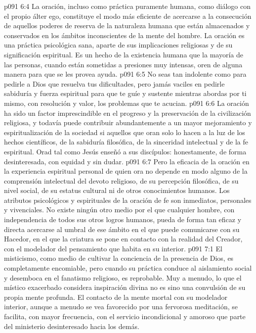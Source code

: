 \vs p091 6:4 La oración, incluso como práctica puramente humana, como diálogo con el propio álter ego, constituye el modo más eficiente de acercarse a la consecución de aquellos poderes de reserva de la naturaleza humana que están almacenados y conservados en los ámbitos inconscientes de la mente del hombre. La oración es una práctica psicológica sana, aparte de sus implicaciones religiosas y de su significación espiritual. Es un hecho de la existencia humana que la mayoría de las personas, cuando están sometidas a presiones muy intensas, oren de alguna manera para que se les provea ayuda.
\vs p091 6:5 \pc No seas tan indolente como para pedirle a Dios que resuelva tus dificultades, pero jamás vaciles en pedirle sabiduría y fuerza espiritual para que te guíe y sustente mientras abordas por ti mismo, con resolución y valor, los problemas que te acucian.
\vs p091 6:6 \pc La oración ha sido un factor imprescindible en el progreso y la preservación de la civilización religiosa, y todavía puede contribuir abundantemente a un mayor mejoramiento y espiritualización de la sociedad si aquellos que oran solo lo hacen a la luz de los hechos científicos, de la sabiduría filosófica, de la sinceridad intelectual y de la fe espiritual. Orad tal como Jesús enseñó a sus discípulos: honestamente, de forma desinteresada, con equidad y sin dudar.
\vs p091 6:7 Pero la eficacia de la oración en la experiencia espiritual personal de quien ora no depende en modo alguno de la comprensión intelectual del devoto religioso, de su percepción filosófica, de su nivel social, de su estatus cultural ni de otros conocimientos humanos. Los atributos psicológicos y espirituales de la oración de fe son inmediatos, personales y vivenciales. No existe ningún otro medio por el que cualquier hombre, con independencia de todos sus otros logros humanos, pueda de forma tan eficaz y directa acercarse al umbral de ese ámbito en el que puede comunicarse con su Hacedor, en el que la criatura se pone en contacto con la realidad del Creador, con el modelador del pensamiento que habita en su interior.
\vs p091 7:1 El misticismo, como medio de cultivar la conciencia de la presencia de Dios, es completamente encomiable, pero cuando su práctica conduce al aislamiento social y desemboca en el fanatismo religioso, es reprobable. Muy a menudo, lo que el místico exacerbado considera inspiración divina no es sino una convulsión de su propia mente profunda. El contacto de la mente mortal con su modelador interior, aunque a menudo se vea favorecido por una fervorosa meditación, se facilita, con mayor frecuencia, con el servicio incondicional y amoroso que parte del ministerio desinteresado hacia los demás.
